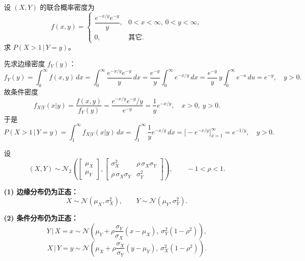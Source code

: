 \begin{example}
设 \((X,Y)\) 的联合概率密度为
\[
f(x,y)=
\begin{cases}
\dfrac{e^{-x/y}e^{-y}}{y}, & 0<x<\infty,\ 0<y<\infty,\\[4pt]
0,& \text{其它}.
\end{cases}
\]
求 \(P(X>1\,|\,Y=y)\)。
\begin{solution}
先求边缘密度 \(f_Y(y)\)：
\[
f_Y(y)=\int_{0}^{\infty} f(x,y)\,dx
      =\int_{0}^{\infty}\frac{e^{-x/y}e^{-y}}{y}\,dx
      =\frac{e^{-y}}{y}\int_{0}^{\infty}e^{-x/y}\,dx
      =\frac{e^{-y}}{y}\,y\int_{0}^{\infty}e^{-u}\,du
      =e^{-y},\quad y>0.
\]
故条件密度
\[
f_{X|Y}(x|y)=\frac{f(x,y)}{f_Y(y)}
=\frac{e^{-x/y}e^{-y}/y}{e^{-y}}
=\frac{1}{y}e^{-x/y},\quad x>0,\ y>0.
\]
于是
\[
P(X>1\,|\,Y=y)
=\int_{1}^{\infty} f_{X|Y}(x|y)\,dx
=\int_{1}^{\infty}\frac{1}{y}e^{-x/y}\,dx
=\Big[-e^{-x/y}\Big]_{x=1}^{\infty}
=e^{-1/y},\quad y>0.
\]
\end{solution}
\end{example}
\begin{theorem}[二维正态的边缘与条件分布]
设
\[
(X,Y)\sim \mathcal N_2\!\left(
\begin{bmatrix}\mu_X\\ \mu_Y\end{bmatrix},
\begin{bmatrix}
\sigma_X^2 & \rho\,\sigma_X\sigma_Y\\
\rho\,\sigma_X\sigma_Y & \sigma_Y^2
\end{bmatrix}
\right),\qquad -1<\rho<1 .
\]

\textbf{(1) 边缘分布仍为正态：}
\[
X\sim \mathcal N(\mu_X,\sigma_X^2),\qquad
Y\sim \mathcal N(\mu_Y,\sigma_Y^2).
\]

\textbf{(2) 条件分布仍为正态：}
\[
Y\,|\,X=x \sim \mathcal N\!\left(
\mu_Y+\rho\frac{\sigma_Y}{\sigma_X}(x-\mu_X),\ \sigma_Y^2(1-\rho^2)
\right),
\]
\[
X\,|\,Y=y \sim \mathcal N\!\left(
\mu_X+\rho\frac{\sigma_X}{\sigma_Y}(y-\mu_Y),\ \sigma_X^2(1-\rho^2)
\right).
\]
\end{theorem}
